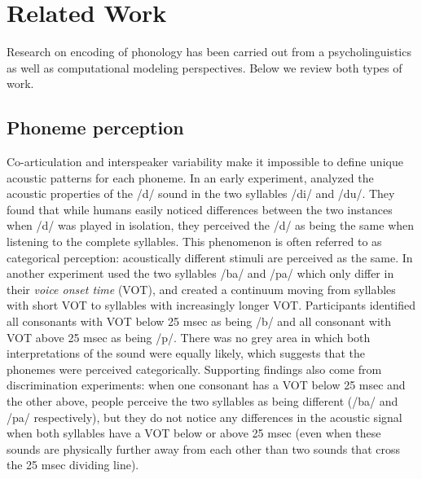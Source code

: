 \section{Related Work}
\label{sec:related}
Research on encoding of phonology has been carried out from a 
psycholinguistics as well as computational modeling perspectives. Below we review
both types of work.
\subsection{Phoneme perception}
\label{sec:phoneme-perception}
Co-articulation and interspeaker variability make it impossible to
define unique acoustic patterns for each phoneme. In an early
experiment, \citet{liberman1967perception}
analyzed the acoustic properties of the /d/ sound in the two syllables
/di/ and /du/. They found that while humans easily noticed differences
between the two instances when /d/  was played in
isolation, they perceived the /d/ as being the same when 
listening to the complete syllables. This phenomenon
is often referred to as categorical perception: acoustically different stimuli 
are perceived as the same. In another experiment \citet{lisker1967} used 
the two syllables /ba/ and /pa/ which only differ in their 
{\it voice onset time} (VOT), 
and created a continuum moving from syllables with short VOT 
to syllables with increasingly longer VOT. Participants identified all consonants 
with VOT below 25 msec as being /b/ and all
consonant with VOT above 25 msec as being /p/. There was no grey area in which both interpretations of the sound were equally likely, which suggests that the phonemes were perceived categorically.
Supporting findings also come from discrimination experiments: when one consonant has a VOT below 25 msec and the other above, people perceive the two syllables as being different (/ba/ and /pa/ respectively), but they do not notice any differences in the acoustic signal when both syllables have a VOT below or above 25 msec (even when these sounds are physically further away from each other than two sounds that cross the 25 msec dividing line). 

